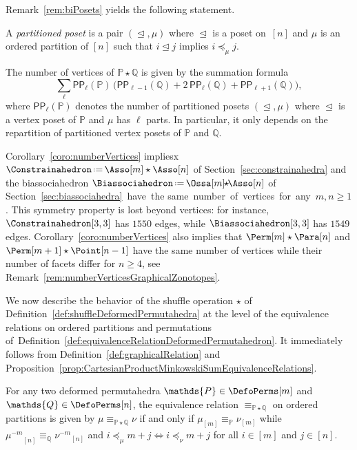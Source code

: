 \documentclass[AHL,Unicode,longabstracts,published]{cedram}
\newcommand{\eqdef}{\mbox{\,\raisebox{0.2ex}{\scriptsize\ensuremath{\mathrm:}}\ensuremath{=}\,}}
\newcommand{\shuffleDP}{\star} %
\newcommand{\polytope}[1]{\mathds{#1}}
\newcommand{\pp}[2]{\mathsf{PP}_{#1}(#2)}
\begin{document}
Remark~\ref{rem:biPosets} yields the following statement.

\begin{defi}\label{def:partitionedPoset}
A
\emph{partitioned poset} is a pair $(\trianglelefteq, \mu)$ where $\trianglelefteq$ is a poset on~$[n]$ and $\mu$ is an ordered partition of $[n]$ such that $i \trianglelefteq j$ implies $i \preccurlyeq_\mu j$.
\end{defi}

\begin{coro}\label{coro:numberVertices}
The number of vertices of $\polytope{P} \shuffleDP \polytope{Q}$ is given by the summation formula
\[
\sum_\ell \pp{\ell}{\polytope{P}} \, \big(\pp{\ell-1}{\polytope{Q}} + 2 \, \pp{\ell}{\polytope{Q}} + \pp{\ell+1}{\polytope{Q}} \big),
\]
where $\pp{\ell}{\polytope{P}}$ denotes the number of partitioned posets $(\trianglelefteq, \mu)$ where $\trianglelefteq$ is a vertex poset of $\polytope{P}$ and $\mu$ has $\ell$ parts. In particular, it only depends on the repartition of partitioned vertex posets of $\polytope{P}$ and $\polytope{Q}$.
\end{coro}

\begin{rema}\label{rem:noSymmetry}
Corollary~\ref{coro:numberVertices} impliesx $\Constrainahedron \eqdef \Asso[m] \shuffleDP \Asso[n]$ of Section~\ref{sec:constrainahedra} and the biassociahedron
${\Biassociahedron \eqdef\Ossa[m]\!\! \shuffleDP\! \!\Asso[n]}$ of Section~\ref{sec:biassociahedra}~have~the same~number~of~vertices~for~any~$\!m,\!n\!\ge\!1$. This symmetry property is lost beyond vertices: for instance, $\Constrainahedron[3,3]$ has $1550$ edges, while $\Biassociahedron[3,3]$ has $1549$ edges. Corollary~\ref{coro:numberVertices} also implies that ${\Perm[m] \shuffleDP \Para[n]}$ and ${\Perm[m+1] \shuffleDP \Point[n-1]}$ have the same number of vertices while their number of facets differ for $n \ge 4$, see Remark~\ref{rem:numberVerticesGraphicalZonotopes}.
\end{rema}

We now describe the behavior of the shuffle operation $\shuffleDP$ of Definition~\ref{def:shuffleDeformedPermutahedra} at the level of the equivalence relations on ordered partitions and permutations of~Definition~\ref{def:equivalenceRelationDeformedPermutahedron}. It immediately follows from Definition~\ref{def:graphicalRelation} and Proposition~\ref{prop:CartesianProductMinkowskiSumEquivalenceRelations}.

\begin{prop}\label{prop:shuffleEquivalenceRelations}
For any two deformed permutahedra $\polytope{P} \in \DefoPerms[m]$ and $\polytope{Q} \in \DefoPerms[n]$, the equivalence relation $\equiv_{\polytope{P} \shuffleDP \polytope{Q}}$ on ordered partitions is given by $\mu \equiv_{\polytope{P} \shuffleDP \polytope{Q}} \nu$ if and only if $\mu_{[m]} \equiv_{\polytope{P}} \nu_{[m]}$ while ${\mu^{-m}}_{[n]} \equiv_{\polytope{Q}} {\nu^{-m}}_{[n]}$ and $i \preccurlyeq_\mu m+j \iff i \preccurlyeq_\nu m+j$ for all $i \in [m]$ and $j \in [n]$.
\end{prop}
\end{document}

